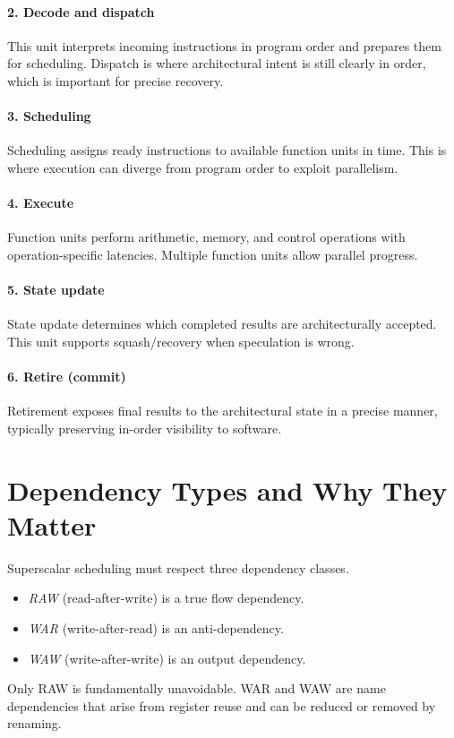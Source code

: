 \paragraph{2. Decode and dispatch}\label{par:ilp-dispatch}
This unit interprets incoming instructions in program order and prepares them for scheduling.
Dispatch is where architectural intent is still clearly in order, which is important for precise recovery.
\paragraph{3. Scheduling}\label{par:ilp-schedule}
Scheduling assigns ready instructions to available function units in time.
This is where execution can diverge from program order to exploit parallelism.
\paragraph{4. Execute}\label{par:ilp-execute}
Function units perform arithmetic, memory, and control operations with operation-specific latencies.
Multiple function units allow parallel progress.
\paragraph{5. State update}\label{par:ilp-state-update}
State update determines which completed results are architecturally accepted.
This unit supports squash/recovery when speculation is wrong.
\paragraph{6. Retire (commit)}\label{par:ilp-retire}
Retirement exposes final results to the architectural state in a precise manner, typically preserving in-order visibility to software.

\section{Dependency Types and Why They Matter}\label{sec:ilp-dependencies}
Superscalar scheduling must respect three dependency classes.
\begin{itemize}
\item \textit{RAW} (read-after-write) is a true flow dependency.
\item \textit{WAR} (write-after-read) is an anti-dependency.
\item \textit{WAW} (write-after-write) is an output dependency.
\end{itemize}
Only RAW is fundamentally unavoidable.
WAR and WAW are name dependencies that arise from register reuse and can be reduced or removed by renaming.

